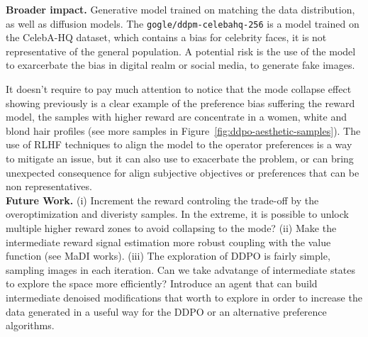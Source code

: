 

\noindent\textbf{Broader impact.}  Generative model trained on matching
the data distribution, as well as diffusion models. The \texttt{gogle/ddpm-celebahq-256} is a model trained on the CelebA-HQ dataset, which contains a bias for celebrity faces, it is not representative of the general population.
A potential risk is the use of the model to exarcerbate the bias in digital realm or social media, to generate fake images.

It doesn't require to pay much attention to notice that the mode collapse effect showing previously is a clear example of the preference bias suffering the reward model, the samples with higher reward are concentrate in a women, white and blond hair profiles (see more samples in Figure~\ref{fig:ddpo-aesthetic-samples}). The
use of RLHF techniques to align the model to the operator preferences is a
way to mitigate an issue, but it can also use to exacerbate the problem, or can bring unexpected consequence for align subjective objectives or preferences
that can be non representatives.\\

\noindent\textbf{Future Work.} (i) Increment the reward controling the trade-off by the overoptimization and diveristy samples. In the extreme, it is possible to unlock multiple higher reward zones to avoid collapsing to the mode? (ii) Make the intermediate reward signal estimation more robust coupling with the value function (see MaDI works). (iii) The exploration of DDPO is
fairly simple, sampling images in each iteration. Can we take advatange of intermediate states to explore the space more efficiently? Introduce an agent that can build intermediate denoised modifications that worth to explore in order to increase the data generated in a useful way for the DDPO or an alternative preference algorithms.
